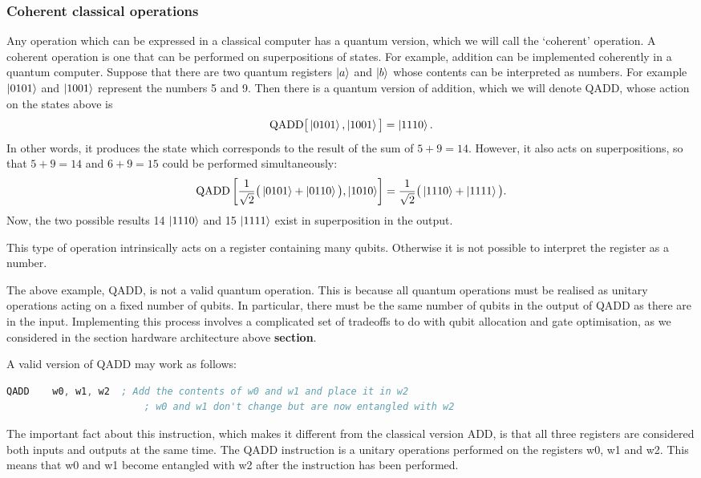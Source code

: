 \subsubsection{Coherent classical operations}

Any operation which can be expressed in a classical computer has a quantum version, which we will call the `coherent' operation. A coherent operation is one that can be performed on superpositions of states. For example, addition can be implemented coherently in a quantum computer. Suppose that there are two quantum registers $\left\vert{a}\right\rangle$ and $\left\vert{b}\right\rangle$ whose contents can be interpreted as numbers. For example $\left\vert{0101}\right\rangle$ and $\left\vert{1001}\right\rangle$ represent the numbers 5 and 9. Then there is a quantum version of addition, which we will denote QADD, whose action on the states above is $$\text{QADD}\big[\left\vert{0101}\right\rangle,\left\vert{1001}\right\rangle\big]=\left\vert{1110}\right\rangle.$$ In other words, it produces the state which corresponds to the result of the sum of $5 + 9 = 14$. However, it also acts on superpositions, so that $5 + 9 = 14$ and $6 + 9 = 15$ could be performed simultaneously: $$\text{QADD}\left[\frac{1}{\sqrt{2}}\big(\left\vert{0101}\right\rangle+\left\vert{0110}\right\rangle\big),\left\vert{1010}\right\rangle\right]=\frac{1}{\sqrt{2}}\big(\left\vert{1110}\right\rangle+\left\vert{1111}\right\rangle\big).$$ Now, the two possible results 14 $\left\vert{1110}\right\rangle$ and 15 $\left\vert{1111}\right\rangle$ exist in superposition in the output.

This type of operation intrinsically acts on a register containing many qubits. Otherwise it is not possible to interpret the register as a number.

The above example, QADD, is not a valid quantum operation. This is because all quantum operations must be realised as unitary operations acting on a fixed number of qubits. In particular, there must be the same number of qubits in the output of QADD as there are in the input. Implementing this process involves a complicated set of tradeoffs to do with qubit allocation and gate optimisation, as we considered in the section hardware architecture above \textbf{section}.

A valid version of QADD may work as follows:
\begin{lstlisting}[language=asm]
    QADD    w0, w1, w2  ; Add the contents of w0 and w1 and place it in w2
                        ; w0 and w1 don't change but are now entangled with w2
\end{lstlisting}
The important fact about this instruction, which makes it different from the classical version ADD, is that all three registers are considered both inputs and outputs at the same time. The QADD instruction is a unitary operations performed on the registers w0, w1 and w2. This means that w0 and w1 become entangled with w2 after the instruction has been performed.


